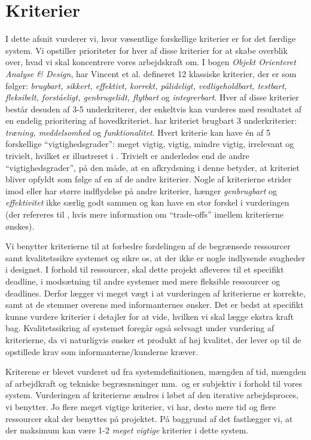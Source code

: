 \section{Kriterier}
\label{sec:kriterier}

I dette afsnit vurderer vi, hvor væsentlige forskellige kriterier er for det færdige system. Vi opstiller prioriteter for hver af disse kriterier for at skabe overblik over, hvad vi skal koncentrere vores arbejdskraft om. I bogen \emph{Objekt Orienteret Analyse \& Design}\cite{ooad}, har Vincent et al. defineret 12 klassiske kriterier, der er som følger: \emph{brugbart, sikkert, effektivt, korrekt, pålideligt, vedligeholdbart, testbart, fleksibelt, forståeligt, genbrugelidt, flytbart} og \emph{integrerbart}. Hver af disse kriterier består desuden af 3-5 underkriterer, der enkeltvis kan vurderes med resultatet af en endelig prioritering af hovedkriteriet. \Fx har kriteriet brugbart 3 underkriterier: \emph{træning, meddelsomhed} og \emph{funktionalitet}. 
Hvert kriterie kan have én af 5 forskellige ``vigtighedsgrader'': meget vigtig, vigtig, mindre vigtig, irrelevant og trivielt, hvilket er illustreret i . Trivielt er anderledes end de andre ``vigtighedsgrader'', på den måde, at en afkrydsning i denne betyder, at kriteriet bliver opfyldt som følge af en af de andre kriterier. 
Nogle af kriterierne strider imod eller har større indflydelse på andre kriterier, \fx hænger \emph{genbrugbart} og \emph{effektivitet} ikke særlig godt sammen og kan have en stor forskel i vurderingen (der refereres til \cite[s.~18]{crit}, hvis mere information om ``trade-offs'' imellem kriterierne ønskes).



Vi benytter kriterierne til at forbedre fordelingen af de begrænsede ressourcer samt kvalitetssikre systemet og sikre os, at der ikke er nogle indlysende svagheder i designet. I forhold til ressourcer, skal dette projekt afleveres til et specifikt deadline, i modsætning til andre systemer med mere fleksible ressourcer og deadlines. Derfor lægger vi meget vægt i at vurderingen af kriterierne er korrekte, samt at de stemmer overens med informanternes ønsker. Det er bedst at specifikt kunne vurdere kriterier i detajler for at vide, hvilken vi skal lægge ekstra kraft bag. Kvalitetssikring af systemet foregår også selvsagt under vurdering af kriterierne, da vi naturligvis ønsker et produkt af høj kvalitet, der lever op til de opstillede krav som informanterne/kunderne kræver.

Kriterene er blevet vurderet ud fra systemdefinitionen, mængden af tid, mængden af arbejdkraft og tekniske begræsnsninger mm.\ og er subjektiv i forhold til vores system. Vurderingen af kriterierne ændres i løbet af den iterative arbejdsproces, vi benytter. Jo flere meget vigtige kriterier, vi har, desto mere tid og flere ressourcer skal der benyttes på projektet. På baggrund af det fastlægger vi, at der maksimum kan være 1-2 \emph{meget vigtige} kriterier i dette system.


